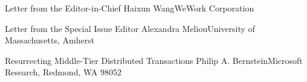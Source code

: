 \documentclass[11pt]{article}
\begin{document}


\begin{bulletin}


%
%

\begin{lettersection}


\begin{letter}{Letter from the Editor-in-Chief}
{Haixun Wang}{WeWork Corporation}

\end{letter}
%
\newpage
%
%
\begin{letter}{Letter from the Special Issue Editor}
{Alexandra Meliou}{University of Massachusetts, Amherst}


\end{letter}

\end{lettersection}


\begin{opinionsection}
\begin{opinion}{Resurrecting Middle-Tier Distributed Transactions}
{Philip A. Bernstein}{Microsoft Research, Redmond, WA 98052}

\end{opinion}
\end{opinionsection}


\end{bulletin}
\end{document}
